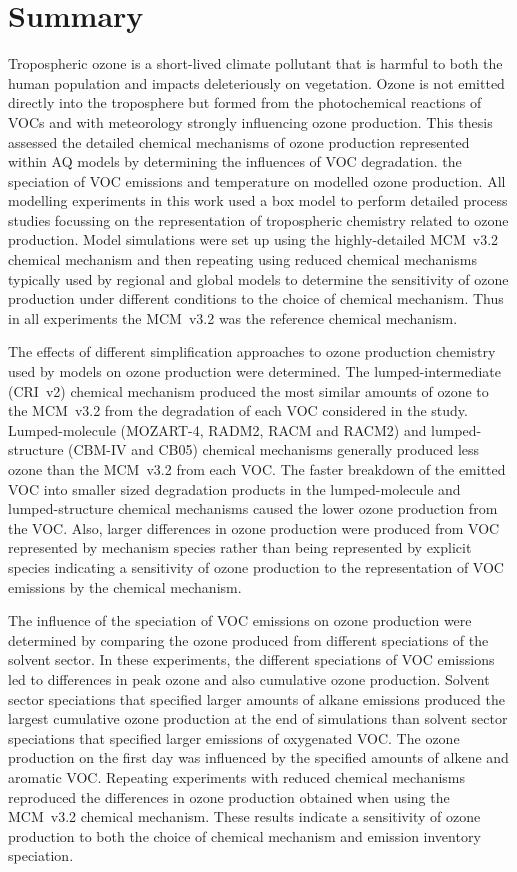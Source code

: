 \section{Summary}
Tropospheric ozone is a short-lived climate pollutant that is harmful to both the human population and impacts deleteriously on vegetation.
Ozone is not emitted directly into the troposphere but formed from the photochemical reactions of VOCs and  with meteorology strongly influencing ozone production.
This thesis assessed the detailed chemical mechanisms of ozone production represented within AQ models by determining the influences of VOC degradation. the speciation of VOC emissions and temperature on modelled ozone production.
All modelling experiments in this work used a box model to perform detailed process studies focussing on the representation of tropospheric chemistry related to ozone production.
Model simulations were set up using the highly-detailed MCM~v3.2 chemical mechanism and then repeating using reduced chemical mechanisms typically used by regional and global models to determine the sensitivity of ozone production under different conditions to the choice of chemical mechanism.
Thus in all experiments the MCM~v3.2 was the reference chemical mechanism.

The effects of different simplification approaches to ozone production chemistry used by models on ozone production were determined.
The lumped-intermediate (CRI~v2) chemical mechanism produced the most similar amounts of ozone to the MCM~v3.2 from the degradation of each VOC considered in the study.
Lumped-molecule (MOZART-4, RADM2, RACM and RACM2) and lumped-structure (CBM-IV and CB05) chemical mechanisms generally produced less ozone than the MCM~v3.2 from each VOC.
The faster breakdown of the emitted VOC into smaller sized degradation products in the lumped-molecule and lumped-structure chemical mechanisms caused the lower ozone production from the VOC.
Also, larger differences in ozone production were produced from VOC represented by mechanism species rather than being represented by explicit species indicating a sensitivity of ozone production to the representation of VOC emissions by the chemical mechanism.

The influence of the speciation of VOC emissions on ozone production were determined by comparing the ozone produced from different speciations of the solvent sector.
In these experiments, the different speciations of VOC emissions led to differences in peak ozone and also cumulative ozone production.
Solvent sector speciations that specified larger amounts of alkane emissions produced the largest cumulative ozone production at the end of simulations than solvent sector speciations that specified larger emissions of oxygenated VOC.
The ozone production on the first day was influenced by the specified amounts of alkene and aromatic VOC.
Repeating experiments with reduced chemical mechanisms reproduced the differences in ozone production obtained when using the MCM~v3.2 chemical mechanism.
These results indicate a sensitivity of ozone production to both the choice of chemical mechanism and emission inventory speciation.

